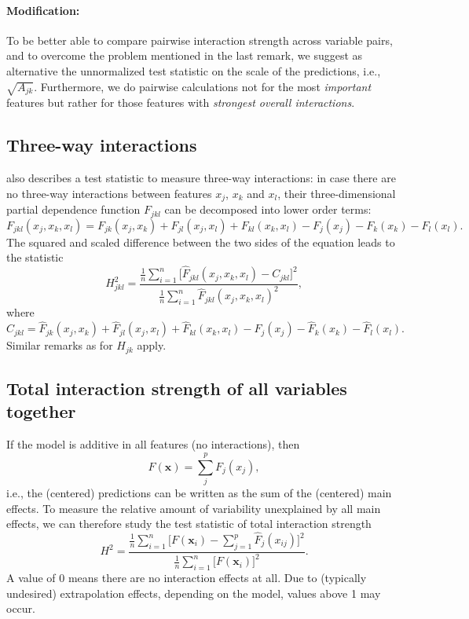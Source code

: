 \documentclass[]{article}
\begin{document}
\paragraph{Modification:} To be better able to compare pairwise interaction strength across variable pairs, and to overcome the problem mentioned in the last remark, we suggest as alternative the unnormalized test statistic on the scale of the predictions, i.e., $\sqrt{A_{jk}}$. 
Furthermore, we do pairwise calculations not for the most {\em important} features but rather for those features with {\em strongest overall interactions}.

\subsection{Three-way interactions}
\cite{friedman2008} also describes a test statistic to measure three-way interactions: in case there are no three-way interactions between features $x_j$, $x_k$ and $x_l$, their three-dimensional partial dependence function $F_{jkl}$ can be decomposed into lower order terms:
$$
  F_{jkl}(x_j, x_k, x_l) = F_{jk}(x_j, x_k) + F_{jl}(x_j, x_l) + F_{kl}(x_k, x_l) - F_j(x_j) - F_k(x_k) - F_l(x_l).
$$
The squared and scaled difference between the two sides of the equation leads to the statistic
$$
  H_{jkl}^2 = \frac{\frac{1}{n} \sum_{i = 1}^n \big[\hat F_{jkl}(x_j, x_k, x_l) - C_{jkl}\big]^2}{\frac{1}{n} \sum_{i = 1}^n \hat F_{jkl}(x_j, x_k, x_l)^2},
$$
where
$$
	C_{jkl} = \hat F_{jk}(x_j, x_k) + \hat F_{jl}(x_j, x_l) + \hat F_{kl}(x_k, x_l) - \hat F_j(x_j) - \hat F_k(x_k) - \hat F_l(x_l).
$$
Similar remarks as for $H_{jk}$ apply.

\subsection{Total interaction strength of all variables together}
If the model is additive in all features (no interactions), then
$$
	F(\mathbf{x}) = \sum_{j}^{p} F_j(x_j),
$$
i.e., the (centered) predictions can be written as the sum of the (centered) main effects.
To measure the relative amount of variability unexplained by all main effects, we can therefore study the test statistic of total interaction strength
$$
  H^2 = \frac{\frac{1}{n} \sum_{i = 1}^n \big[F(\mathbf{x}_i) - \sum_{j = 1}^p\hat F_j(x_{ij})\big]^2}{\frac{1}{n} \sum_{i = 1}^n\big[F(\mathbf{x}_i)\big]^2}.
$$
A value of 0 means there are no interaction effects at all. Due to (typically undesired) extrapolation effects, depending on the model, values above 1 may occur.
\end{document}
